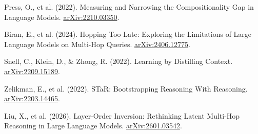 \documentclass[11pt,a4paper]{article}
\newcommand{\sub}[1]{\par\medskip\noindent{\large\bfseries\color{ink}#1}\par\smallskip}
\begin{document}
\sub{参考文献}
{\footnotesize\raggedright\setlength{\parskip}{2pt}\noindent
[1] Press, O., et al. (2022). Measuring and Narrowing the Compositionality Gap in Language Models. \href{https://arxiv.org/abs/2210.03350}{arXiv:2210.03350}.\par\noindent
[2] Biran, E., et al. (2024). Hopping Too Late: Exploring the Limitations of Large Language Models on Multi-Hop Queries. \href{https://arxiv.org/abs/2406.12775}{arXiv:2406.12775}.\par\noindent
[3] Snell, C., Klein, D., \& Zhong, R. (2022). Learning by Distilling Context. \href{https://arxiv.org/abs/2209.15189}{arXiv:2209.15189}.\par\noindent
[4] Zelikman, E., et al. (2022). STaR: Bootstrapping Reasoning With Reasoning. \href{https://arxiv.org/abs/2203.14465}{arXiv:2203.14465}.\par\noindent
[5] Liu, X., et al. (2026). Layer-Order Inversion: Rethinking Latent Multi-Hop Reasoning in Large Language Models. \href{https://arxiv.org/abs/2601.03542}{arXiv:2601.03542}.}
\end{document}
